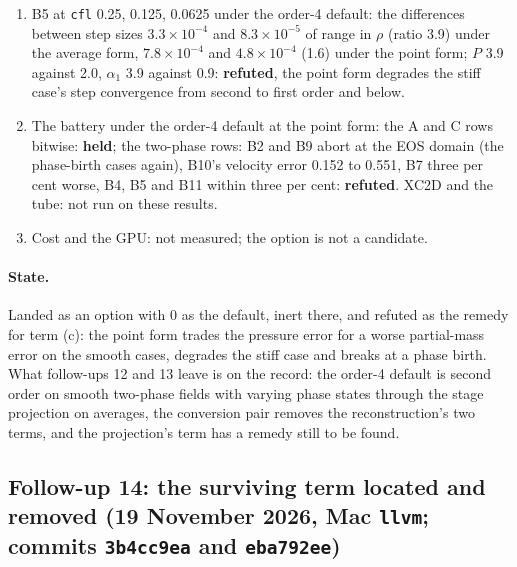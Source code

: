 \documentclass[11pt,a4paper]{article}
\newcommand{\code}[1]{\texttt{\small #1}}
\begin{document}
\begin{enumerate}[nosep]
{      written}, and rightly so: the averages of a field in equilibrium
      are off the constraint at second order, which is the very term the
      item was built on, so the converted averages must carry that
      residual; the prediction asked for the wrong quantity.
\item B5 at \code{cfl} 0.25, 0.125, 0.0625 under the order-4 default:
      the differences between step sizes $3.3\times10^{-4}$ and
      $8.3\times10^{-5}$ of range in $\rho$ (ratio 3.9) under the average
      form, $7.8\times10^{-4}$ and $4.8\times10^{-4}$ (1.6) under the
      point form; $P$ 3.9 against 2.0, $\alpha_1$ 3.9 against 0.9:
      \textbf{refuted}, the point form degrades the stiff case's step
      convergence from second to first order and below.
\item The battery under the order-4 default at the point form: the A
      and C rows bitwise: \textbf{held}; the two-phase rows: B2 and B9
      abort at the EOS domain (the phase-birth cases again), B10's
      velocity error 0.152 to 0.551, B7 three per cent worse, B4, B5 and
      B11 within three per cent: \textbf{refuted}.  XC2D and the tube:
      not run on these results.
\item Cost and the GPU: not measured; the option is not a candidate.
\end{enumerate}

\paragraph{State.}  Landed as an option with 0 as the default, inert
there, and refuted as the remedy for term (c): the point form trades
the pressure error for a worse partial-mass error on the smooth cases,
degrades the stiff case and breaks at a phase birth.  What follow-ups
12 and 13 leave is on the record: the order-4 default is second order on
smooth two-phase fields with varying phase states through the stage
projection on averages, the conversion pair removes the reconstruction's
two terms, and the projection's term has a remedy still to be found.


\subsection{Follow-up 14: the surviving term located and removed (19 November 2026, Mac \code{llvm}; commits \code{3b4cc9ea} and \code{eba792ee})}
\label{sec:fu14}
\end{document}
